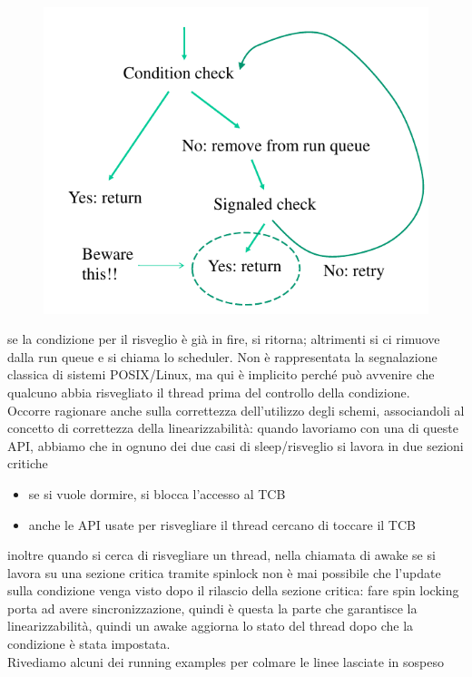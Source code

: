 \documentclass[12pt, oneside]{extbook}
\begin{document}
\begin{figure}[!h]
	\includegraphics[scale=0.4]{immagini/wait_activities.png}
\end{figure}
se la condizione per il risveglio è già in fire, si ritorna; altrimenti si ci rimuove dalla run queue e si chiama lo scheduler. Non è rappresentata la segnalazione classica di sistemi POSIX/Linux, ma qui è implicito perché può avvenire che qualcuno abbia risvegliato il thread prima del controllo della condizione.\\ Occorre ragionare anche sulla correttezza dell'utilizzo degli schemi, associandoli al concetto di correttezza della linearizzabilità: quando lavoriamo con una di queste API, abbiamo che in ognuno dei due casi di sleep/risveglio si lavora in due sezioni critiche
\begin{itemize}
\item se si vuole dormire, si blocca l'accesso al TCB
\item anche le API usate per risvegliare il thread cercano di toccare il TCB
\end{itemize}
inoltre quando si cerca di risvegliare un thread, nella chiamata di awake se si lavora su una sezione critica tramite spinlock non è mai possibile che l'update sulla condizione venga visto dopo il rilascio della sezione critica: fare spin locking porta ad avere sincronizzazione, quindi è questa la parte che garantisce la linearizzabilità, quindi un awake aggiorna lo stato del thread dopo che la condizione è stata impostata.\\Rivediamo alcuni dei running examples per colmare le linee lasciate in sospeso
\end{document}
